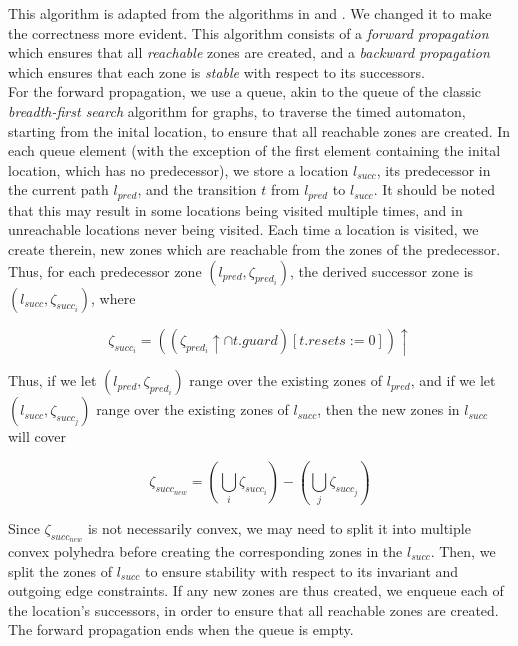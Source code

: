 \documentclass{article}
\begin{document}
This algorithm is adapted from the algorithms in
\cite{DBLP:conf/cav/GuhaNA12} and \cite{guha2013notes}. We changed it
to make the correctness more evident. 
This algorithm consists of a \emph{forward
  propagation} which ensures that all \emph{reachable} zones are created, and a
\emph{backward propagation} which ensures that each zone is \emph{stable} with
respect to its successors. \\

For the forward propagation, we use a queue,
akin to the queue of the classic \emph{breadth-first search} algorithm
for graphs, to traverse the timed automaton, starting from the inital
location, to ensure that all reachable zones are created. In each
queue element (with the exception of the first element containing the
inital location, which has no predecessor), we store a location
$l_{succ}$, its predecessor in the current path $l_{pred}$, and the
transition $t$ from $l_{pred}$ to $l_{succ}$. It should be noted
that this may result in some locations being visited multiple times,
and in unreachable locations never being visited. Each time a location
is visited, we create therein, new zones which are reachable from the
zones of the predecessor. \\
Thus, for each predecessor zone $(l_{pred}, \zeta _{pred_{i}})$, the
derived successor zone is $(l_{succ}, \zeta _{succ_{i}})$, where

\begin{displaymath} 
  \zeta _{succ_{i}} = ((\zeta _{pred_{i}} \uparrow \cap t.guard)[t.resets := 0]) \uparrow
\end{displaymath} 

Thus, if we let  $(l_{pred}, \zeta _{pred_{i}})$ range over the
existing zones of $l_{pred}$, and if we let  $(l_{succ}, \zeta
_{succ_{j}})$ range over the existing zones of $l_{succ}$, then the
new zones in $l_{succ}$ will cover

\begin{displaymath} 
  \zeta _{succ_{new}} = (\bigcup _{i} \zeta_{succ_{i}}) - (\bigcup _{j} \zeta_{succ_{j}})
\end{displaymath} 

Since $\zeta _{succ_{new}}$ is not necessarily convex, we may need to
split it into multiple convex polyhedra before creating the
corresponding zones in the $l_{succ}$. Then, we split the zones of
$l_{succ}$ to ensure stability with respect to
its invariant and outgoing edge constraints. If any new
zones are thus created, we enqueue each of the location's successors,
in order to ensure that all reachable zones are created. The forward
propagation ends when the queue is empty. \\
\end{document}
